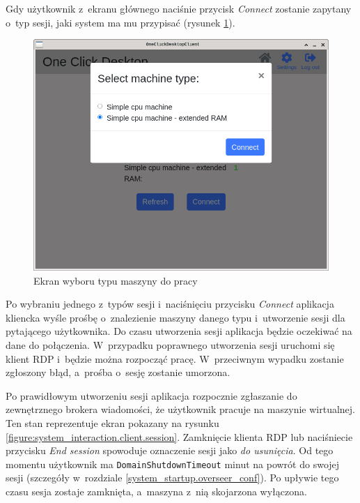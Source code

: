 \documentclass[../opis-rozwiazania.tex]{subfiles}
\begin{document}
Gdy użytkownik z~ekranu głównego naciśnie przycisk \textit{Connect} zostanie zapytany o~typ sesji, jaki system ma mu przypisać (rysunek \ref{figure:system_interaction.client.select}).

\begin{figure}[ht!]
  \centering
  \includegraphics[width=\textwidth]{resources/client_select.png}
  \caption{Ekran wyboru typu maszyny do pracy}
  \label{figure:system_interaction.client.select}
\end{figure}

Po wybraniu jednego z~typów sesji i~naciśnięciu przycisku \textit{Connect} aplikacja kliencka wyśle prośbę o~znalezienie maszyny danego typu i~utworzenie sesji dla pytającego użytkownika.
Do czasu utworzenia sesji aplikacja będzie oczekiwać na dane do połączenia.
W~przypadku poprawnego utworzenia sesji uruchomi się klient RDP i~będzie można rozpocząć pracę.
W~przeciwnym wypadku zostanie zgłoszony błąd, a~prośba o~sesję zostanie umorzona.

Po prawidłowym utworzeniu sesji aplikacja rozpocznie zgłaszanie do zewnętrznego brokera wiadomości, że użytkownik pracuje na maszynie wirtualnej.
Ten stan reprezentuje ekran pokazany na rysunku \ref{figure:system_interaction.client.session}.
Zamknięcie klienta RDP lub naciśniecie przycisku \textit{End session} spowoduje oznaczenie sesji jako \textit{do usunięcia}.
Od tego momentu użytkownik ma \texttt{DomainShutdownTimeout} minut na powrót do swojej sesji (szczegóły w~rozdziale \ref{system_startup.overseer_conf}).
Po upływie tego czasu sesja zostaje zamknięta, a~maszyna z~nią skojarzona wyłączona.
\end{document}

